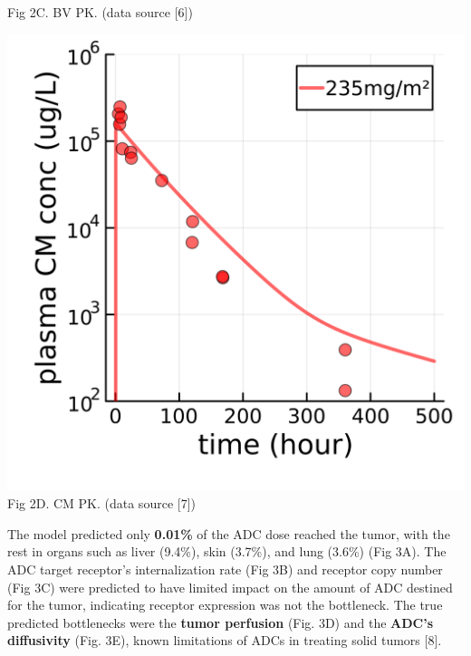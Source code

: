 \documentclass[portrait,fontscale=0.3,paperwidth=36in,paperheight=48in]{baposter}
\begin{document}
\begin{poster}
{\begin{minipage}[b]{0.24\linewidth}
\scriptsize{Fig 2C. BV PK. (data source [6])}
\end{minipage}
\begin{minipage}[b]{0.24\linewidth}
\centering
\includegraphics[width=\textwidth]{../img/cantuzumab-mertansine-pk.png}
\scriptsize{Fig 2D. CM PK. (data source [7])}
\end{minipage}

\smallskip

\begin{minipage}[ht]{0.42\linewidth}

The model predicted only \textbf{0.01\%} of the ADC dose reached the tumor, with the rest in organs such as liver (9.4\%), skin (3.7\%), and lung (3.6\%) (Fig 3A).
The ADC target receptor's internalization rate (Fig 3B) and receptor copy number (Fig 3C) were predicted to have limited impact on the amount of ADC destined for the tumor, indicating receptor expression was not the bottleneck.
The true predicted bottlenecks were the \textbf{tumor perfusion} (Fig. 3D) and the \textbf{ADC's diffusivity} (Fig. 3E), known limitations of ADCs in treating solid tumors [8].


\end{minipage}}
\end{poster}
\end{document}
